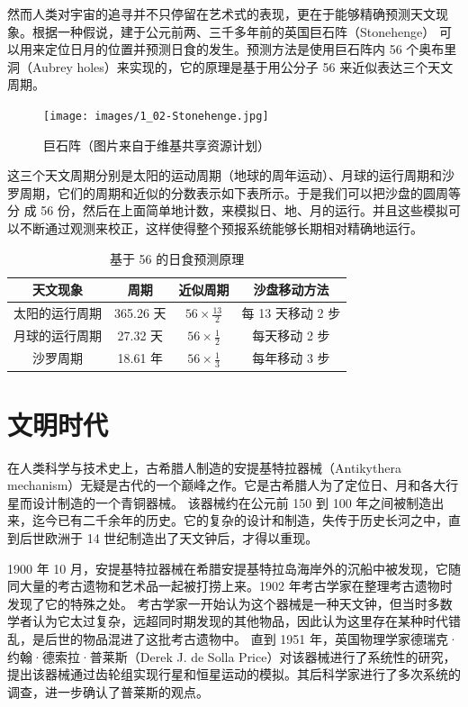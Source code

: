 \documentclass[a4paper,10.5pt]{book}
\begin{document}
然而人类对宇宙的追寻并不只停留在艺术式的表现，更在于能够精确预测天文现象。根据一种假说，建于公元前两、三千多年前的英国巨石阵（Stonehenge）
可以用来定位日月的位置并预测日食的发生。预测方法是使用巨石阵内 56 个奥布里洞（Aubrey holes）来实现的，它的原理是基于用公分子 56 来近似表达三个天文周期。

\begin{figure}[ht]
\centering
\texttt{[image: images/1\_02-Stonehenge.jpg]}
\caption{巨石阵（图片来自于维基共享资源计划）}
\end{figure}

这三个天文周期分别是太阳的运动周期（地球的周年运动）、月球的运行周期和沙罗周期，它们的周期和近似的分数表示如下表所示。于是我们可以把沙盘的圆周等分
成 56 份，然后在上面简单地计数，来模拟日、地、月的运行。并且这些模拟可以不断通过观测来校正，这样使得整个预报系统能够长期相对精确地运行。\cite{beggs2012unifying}

\begin{table}[tbhp]
\centering
\begin{tabular}{|c|c|c|c|}
\hline
天文现象 & 周期 & 近似周期 & 沙盘移动方法 \\
\hline
太阳的运行周期 & 365.26 天 & $ 56 \times \frac{13}{2} $ & 每 13 天移动 2 步 \\
\hline
月球的运行周期 & 27.32 天 & $ 56 \times \frac{1}{2} $  & 每天移动 2 步 \\
\hline
沙罗周期 & 18.61 年 & $ 56 \times \frac{1}{3} $  & 每年移动 3 步 \\
\hline
\end{tabular}
\caption{基于 56 的日食预测原理}
\end{table}

\section{文明时代}

在人类科学与技术史上，古希腊人制造的安提基特拉器械（Antikythera mechanism）无疑是古代的一个巅峰之作。它是古希腊人为了定位日、月和各大行星而设计制造的一个青铜器械。
该器械约在公元前 150 到 100 年之间被制造出来，迄今已有二千余年的历史。它的复杂的设计和制造，失传于历史长河之中，直到后世欧洲于 14 世纪制造出了天文钟后，才得以重现。

1900 年 10 月，安提基特拉器械在希腊安提基特拉岛海岸外的沉船中被发现，它随同大量的考古遗物和艺术品一起被打捞上来。1902 年考古学家在整理考古遗物时发现了它的特殊之处。
考古学家一开始认为这个器械是一种天文钟，但当时多数学者认为它太过复杂，远超同时期发现的其他物品，因此认为这里存在某种时代错乱，是后世的物品混进了这批考古遗物中。
直到 1951 年，英国物理学家德瑞克·约翰·德索拉·普莱斯（Derek J. de Solla Price）对该器械进行了系统性的研究，提出该器械通过齿轮组实现行星和恒星运动的模拟。其后科学家进行了多次系统的调查，进一步确认了普莱斯的观点。
\end{document}
